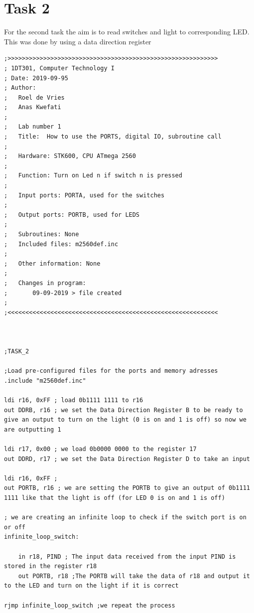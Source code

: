 \documentclass[a4paper,12pt]{article}
\begin{document}
\section{Task 2}
For the second task the aim is to read switches and light to corresponding LED. This was done by using a data direction register 
\lstset{style=Asm}

\begin{lstlisting}
;>>>>>>>>>>>>>>>>>>>>>>>>>>>>>>>>>>>>>>>>>>>>>>>>>>>>>>>>>>>
; 1DT301, Computer Technology I
; Date: 2019-09-95
; Author:
;   Roel de Vries
;   Anas Kwefati
;
;	Lab number 1
;	Title:	How to use the PORTS, digital IO, subroutine call
;
;	Hardware: STK600, CPU ATmega 2560
;
;	Function: Turn on Led n if switch n is pressed
;
;	Input ports: PORTA, used for the switches
;
;	Output ports: PORTB, used for LEDS
;
;	Subroutines: None
;	Included files: m2560def.inc
;
;	Other information: None
;
;	Changes in program:
;		09-09-2019 > file created
;
;<<<<<<<<<<<<<<<<<<<<<<<<<<<<<<<<<<<<<<<<<<<<<<<<<<<<<<<<<<<



;TASK_2

;Load pre-configured files for the ports and memory adresses
.include "m2560def.inc"

ldi r16, 0xFF ; load 0b1111 1111 to r16
out DDRB, r16 ; we set the Data Direction Register B to be ready to give an output to turn on the light (0 is on and 1 is off) so now we are outputting 1

ldi r17, 0x00 ; we load 0b0000 0000 to the register 17
out DDRD, r17 ; we set the Data Direction Register D to take an input  

ldi r16, 0xFF ; 
out PORTB, r16 ; we are setting the PORTB to give an output of 0b1111 1111 like that the light is off (for LED 0 is on and 1 is off) 

; we are creating an infinite loop to check if the switch port is on or off
infinite_loop_switch:

	in r18, PIND ; The input data received from the input PIND is stored in the register r18
	out PORTB, r18 ;The PORTB will take the data of r18 and output it to the LED and turn on the light if it is correct 

rjmp infinite_loop_switch ;we repeat the process


\end{lstlisting}
\end{document}
